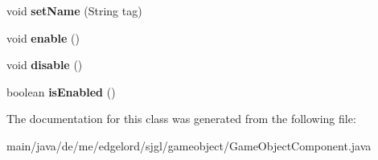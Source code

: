 \begin{DoxyCompactItemize}
\mbox{\label{classde_1_1me_1_1edgelord_1_1sjgl_1_1gameobject_1_1_game_object_component_a096c46ead54e185689465462f2720b3c}} 
void {\bfseries set\+Name} (String tag)
\item 
\mbox{\label{classde_1_1me_1_1edgelord_1_1sjgl_1_1gameobject_1_1_game_object_component_a58419fd6d5037b531efbb7926f840213}} 
void {\bfseries enable} ()
\item 
\mbox{\label{classde_1_1me_1_1edgelord_1_1sjgl_1_1gameobject_1_1_game_object_component_a17f3c5f475fe42b4834683d3052422cd}} 
void {\bfseries disable} ()
\item 
\mbox{\label{classde_1_1me_1_1edgelord_1_1sjgl_1_1gameobject_1_1_game_object_component_a972dceb445ed14ec37e31e3dbea07c10}} 
boolean {\bfseries is\+Enabled} ()
\end{DoxyCompactItemize}


The documentation for this class was generated from the following file\+:\begin{DoxyCompactItemize}
\item 
main/java/de/me/edgelord/sjgl/gameobject/Game\+Object\+Component.\+java\end{DoxyCompactItemize}
